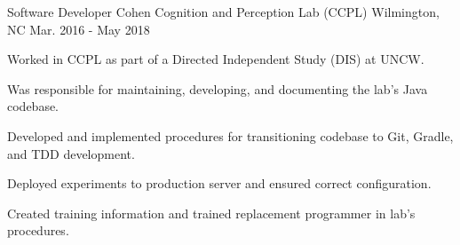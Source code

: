 

\begin{cventries}
  \cventry
    {Software Developer} %
    {Cohen Cognition and Perception Lab (CCPL)} %
    {Wilmington, NC} %
    {Mar. 2016 - May 2018} %
    {
      \begin{cvitems}
        \item {Worked in CCPL as part of a Directed Independent Study (DIS) at UNCW.}
        \item {Was responsible for maintaining, developing, and documenting the lab's Java codebase.}
        \item {Developed and implemented procedures for transitioning codebase to Git, Gradle, and TDD development.}
        \item {Deployed experiments to production server and ensured correct configuration.}
        \item {Created training information and trained replacement programmer in lab's procedures.}
      \end{cvitems}
    }
    

\end{cventries}
